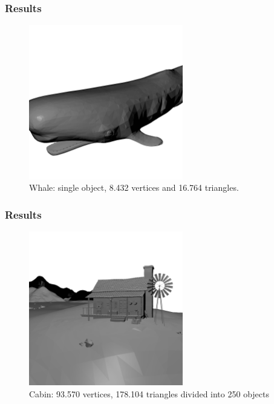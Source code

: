 \documentclass{beamer}
\newenvironment{figure*}%
{\begin{figure}}
{\end{figure}}
\begin{document}
\begin{frame}
  \frametitle{Results}
\begin{figure}
\centering
\includegraphics[width=0.6\textwidth]{whale.png}
\caption{Whale: single object, 8.432 vertices and 16.764 triangles.}
\end{figure}
\end{frame}


\begin{frame}
  \frametitle{Results}
\begin{figure}
\centering
\includegraphics[width=0.6\textwidth]{cabin.png}
\caption{Cabin: 93.570 vertices, 178.104 triangles divided into 250
  objects}
\end{figure}
\end{frame}
\end{document}
